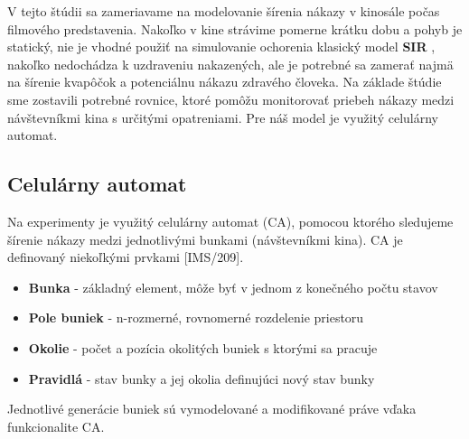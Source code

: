 \documentclass[a4paper, 11pt]{article}
\begin{document}
	\par V tejto štúdii sa zameriavame na modelovanie šírenia nákazy v kinosále počas filmového predstavenia. Nakoľko v kine strávime pomerne krátku dobu a pohyb je statický, nie je vhodné použiť na simulovanie ochorenia klasický model \textbf{SIR} \cite{basicmodels}, nakoľko nedochádza k uzdraveniu nakazených, ale je potrebné sa zamerať najmä na šírenie kvapôčok a potenciálnu nákazu zdravého človeka. Na základe štúdie \cite{joslelieveldfrankhelleiset.al.2020} sme zostavili potrebné rovnice, ktoré pomôžu monitorovať priebeh nákazy medzi návštevníkmi kina s určitými opatreniami. Pre náš model je využitý celulárny automat.
	
	
	
	    \subsection{Celulárny automat}
        Na experimenty je využitý celulárny automat (CA), pomocou ktorého sledujeme šírenie nákazy medzi jednotlivými bunkami (návštevníkmi kina). CA je definovaný niekoľkými prvkami [IMS/209].	
        \begin{itemize}
            \item \textbf{Bunka} - základný element, môže byť v jednom z konečného počtu stavov
            \item \textbf{Pole buniek} - n-rozmerné, rovnomerné rozdelenie priestoru
            \item \textbf{Okolie} - počet a pozícia okolitých buniek s ktorými sa pracuje
            \item \textbf{Pravidlá} - stav bunky a jej okolia definujúci nový stav bunky
        \end{itemize}
        Jednotlivé generácie buniek sú vymodelované a modifikované práve vďaka funkcionalite CA. 
    
\end{document}
